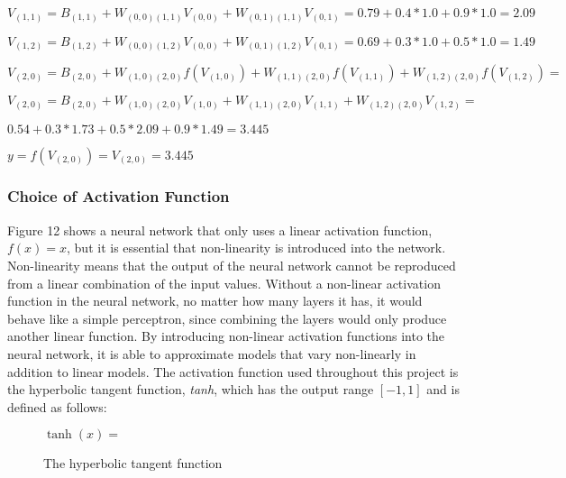 \documentclass[titlepage]{article}
\begin{document}
\vskip 0.2cm

\centerline{$V_{(1, 1)} = B_{(1, 1)} + W_{(0, 0) (1, 1)} V_{(0, 0)} + W_{(0, 1) (1, 1)} V_{(0, 1)} = 0.79 + 0.4 * 1.0 + 0.9 * 1.0 = 2.09$}

\vskip 0.2cm

\centerline{$V_{(1, 2)} = B_{(1, 2)} + W_{(0, 0) (1, 2)} V_{(0, 0)} + W_{(0, 1) (1, 2)} V_{(0, 1)} = 0.69 + 0.3 * 1.0 + 0.5 * 1.0 = 1.49$}

\vskip 0.5cm

\centerline{$V_{(2, 0)} = B_{(2, 0)} + W_{(1, 0) (2, 0)} f(V_{(1, 0)}) + W_{(1, 1) (2, 0)} f(V_{(1, 1)}) + W_{(1, 2) (2, 0)} f(V_{(1, 2)}) =$}

\vskip 0.2cm

\centerline{$V_{(2, 0)} = B_{(2, 0)} + W_{(1, 0) (2, 0)} V_{(1, 0)} + W_{(1, 1) (2, 0)} V_{(1, 1)} + W_{(1, 2) (2, 0)} V_{(1, 2)} =$}

\vskip 0.2cm

\centerline{$0.54 + 0.3 * 1.73 + 0.5 * 2.09 + 0.9 * 1.49 = 3.445$}

\vskip 0.5cm

\centerline{$y = f(V_{(2, 0)}) = V_{(2, 0)} = 3.445$}

\vskip 1cm

\subsubsection{Choice of Activation Function}

\vskip 0.2cm

Figure 12 shows a neural network that only uses a linear activation function, $f(x) = x$, but it is essential that non-linearity is introduced into the network. Non-linearity means that the output of the neural network cannot be reproduced from a linear combination of the input values. Without a non-linear activation function in the neural network, no matter how many layers it has, it would behave like a simple perceptron, since combining the layers would only produce another linear function. By introducing non-linear activation functions into the neural network, it is able to approximate models that vary non-linearly in addition to linear models. The activation function used throughout this project is the hyperbolic tangent function, \emph{tanh}, which has the output range $[-1, 1]$ and is defined as follows:

\vskip 0.4cm

\begin{figure}[h]
    \centerline{$\tanh(x) =$ }
    \vskip 0.2cm
    \caption{The hyperbolic tangent function}
\end{figure}
\end{document}
